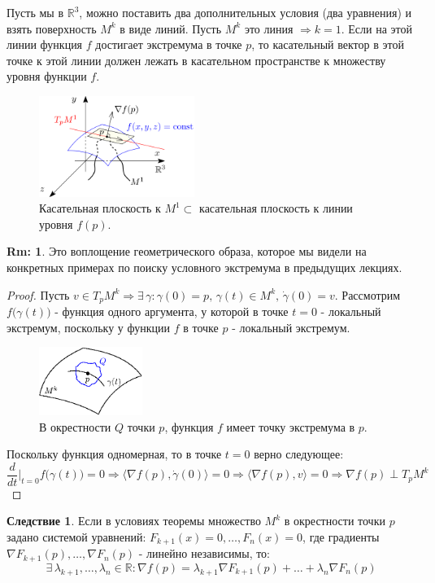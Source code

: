 \documentclass[12pt]{article}
\newcommand{\MR}{\mathbb{R}}
\theoremstyle{definition}
\newtheorem{rem}{Rm:}
\newtheorem{corollary}{Следствие}
\begin{document}
Пусть мы в $\MR^3$, можно поставить два дополнительных условия (два уравнения) и взять поверхность $M^k$ в виде линий. Пусть $M^k$ это линия $\Rightarrow k = 1$. Если на этой линии функция $f$ достигает экстремума в точке $p$, то касательный вектор в этой точке к этой линии должен лежать в касательном пространстве к множеству уровня функции $f$.

\begin{figure}[H]
	\centering
	\includegraphics[width=0.45\textwidth]{20_3.png}
	\caption{Касательная плоскость к $M^1 \subset$ касательная плоскость к линии уровня $f(p)$.}
	\label{20_3}
\end{figure}
\begin{rem}
	Это воплощение геометрического образа, которое мы видели на конкретных примерах по поиску условного экстремума в предыдущих лекциях.
\end{rem}
\begin{proof}
	Пусть $v \in T_p M^k \Rightarrow \exists \, \gamma \colon \gamma(0) = p, \, \gamma(t) \in M^k, \, \dot{\gamma}(0) = v$. Рассмотрим $f\big(\gamma(t)\big)$ - функция одного аргумента, у которой в точке $t = 0$ - локальный экстремум, поскольку у функции $f$ в точке $p$ - локальный экстремум.
	\begin{figure}[H]
		\centering
		\includegraphics[width=0.3\textwidth]{20_4.eps}
		\caption{В окрестности $Q$ точки $p$, функция $f$ имеет точку экстремума в $p$.}
		\label{20_4}
	\end{figure}
	Поскольку функция одномерная, то в точке $t = 0$ верно следующее:
	$$
		\dfrac{d}{dt}\bigg|_{t=0}f\big(\gamma(t)\big) = 0 \Rightarrow \langle \nabla f(p), \dot{\gamma}(0) \rangle = 0 \Rightarrow \langle \nabla f(p), v \rangle = 0 \Rightarrow \nabla f(p) \perp T_p M^k
	$$
\end{proof}
\begin{corollary}
	Если в условиях теоремы множество $M^k$ в окрестности точки $p$ задано системой уравнений: $F_{k+1}(x) = 0, \dotsc, F_n(x) = 0$, где градиенты $\nabla F_{k+1}(p), \dotsc, \nabla F_n (p)$ - линейно независимы, то: 
	$$
		\exists \, \lambda_{k+1}, \dotsc, \lambda_n \in \MR \colon \nabla f(p) = \lambda_{k+1} \nabla F_{k+1} (p) + \dotsc + \lambda_n \nabla F_n(p)
	$$
\end{corollary}
\end{document}
